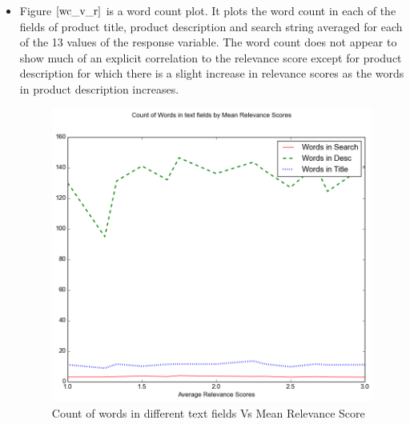 \documentclass[twoside,12pt]{article}
\begin{document}
\begin{itemize}
	
\FloatBarrier
\item 
Figure $\eqref{wc_v_r}$ is a word count plot. It plots the word count in each of the fields of product title, product description and search string averaged for each of the 13 values of the response variable. The word count does not appear to show much of an explicit correlation to the relevance score except for product description for which there is a slight increase in relevance scores as the words in product description increases.
		
		\begin{figure}[!htbp]
			\centering
			\includegraphics[scale=.43]{DataVisualization/length_relv_plot.png} 
			\caption{Count of words in different text fields Vs Mean Relevance Score}
			\label{wc_v_r}
		\end{figure}


\end{itemize}
\end{document}
